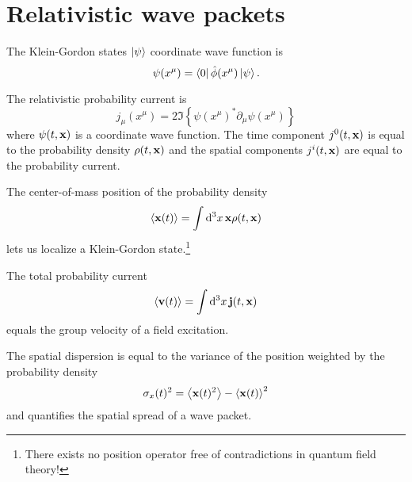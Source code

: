 \section{Relativistic wave packets}

\begin{definition}
	The Klein-Gordon states $\ket{\psi}$ coordinate wave function is
	\begin{equation}
		\psi(x^\mu)
		=
		\bra{0}
		\hat\phi(x^\mu)
		\ket{\psi}
		.
	\end{equation}
\end{definition}
\begin{definition}
	The relativistic probability current is
	\begin{equation}
		j_\mu(x^\mu)
		=
		2
		\Im\left\{
			\psi(x^\mu)^*
			\partial_\mu
			\psi(x^\mu)
		\right\}
		\label{eq:qkg_probability_current}
	\end{equation}
	where $\psi(t,\vb{x})$ is a coordinate wave function.
	The time component $j^0(t,\vb{x})$ is equal to the probability density $\rho(t,\vb{x})$ and the spatial components $j^i(t,\vb{x})$ are equal to the probability current.
\end{definition}
\begin{definition}[Localization]
	The center-of-mass position of the probability density
	\begin{equation}
		\expval{\vb{x}(t)}
		=
		\int\dd[3]{x}
		\vb{x}
		\rho(t,\vb{x})
	\end{equation}
	lets us localize a Klein-Gordon state.\footnote{There exists no position operator free of contradictions in quantum field theory!}
\end{definition}
\begin{definition}
	The total probability current
	\begin{equation}
		\expval{\vb{v}(t)}
		=
		\int\dd[3]{x}
		\vb{j}(t,\vb{x})
		\label{eq:group_velocity}
	\end{equation}
	equals the group velocity of a field excitation.
\end{definition}
\begin{definition}
	The spatial dispersion is equal to the variance of the position weighted by the probability density
	\begin{equation}
		\sigma_x(t)^2
		=
		\expval{\vb{x}(t)^2}
		-
		\expval{\vb{x}(t)}^2
	\end{equation}
	and quantifies the spatial spread of a wave packet.
\end{definition}